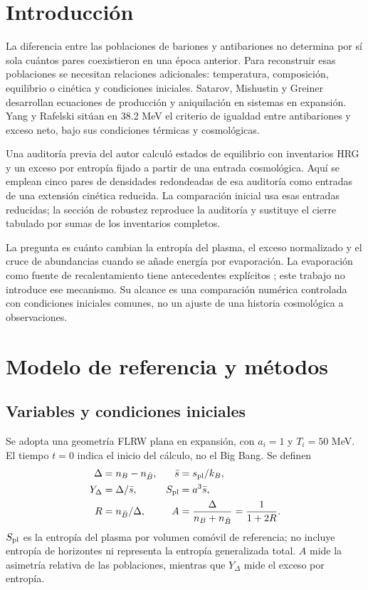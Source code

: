 \documentclass[10pt,twocolumn,a4paper]{article}
\newcommand{\nb}{{n_{\bar B}}}
\newcommand{\Y}{{Y_\Delta}}
\newcommand{\sbar}{\bar s}
\begin{document}
\section{Introducción}
La diferencia entre las poblaciones de bariones y antibariones no determina por sí sola cuántos pares coexistieron en una época anterior. Para reconstruir esas poblaciones se necesitan relaciones adicionales: temperatura, composición, equilibrio o cinética y condiciones iniciales. Satarov, Mishustin y Greiner \cite{satarov} desarrollan ecuaciones de producción y aniquilación en sistemas en expansión. Yang y Rafelski \cite{yang} sitúan en 38.2 MeV el criterio de igualdad entre antibariones y exceso neto, bajo sus condiciones térmicas y cosmológicas.

Una auditoría previa del autor \cite{garcia} calculó estados de equilibrio con inventarios HRG y un exceso por entropía fijado a partir de una entrada cosmológica. Aquí se emplean cinco pares de densidades redondeadas de esa auditoría como entradas de una extensión cinética reducida. La comparación inicial usa esas entradas reducidas; la sección de robustez reproduce la auditoría y sustituye el cierre tabulado por sumas de los inventarios completos.

La pregunta es cuánto cambian la entropía del plasma, el exceso normalizado y el cruce de abundancias cuando se añade energía por evaporación. La evaporación como fuente de recalentamiento tiene antecedentes explícitos \cite{haque}; este trabajo no introduce ese mecanismo. Su alcance es una comparación numérica controlada con condiciones iniciales comunes, no un ajuste de una historia cosmológica a observaciones.

\section{Modelo de referencia y métodos}
\subsection{Variables y condiciones iniciales}
Se adopta una geometría FLRW plana en expansión, con $a_i=1$ y $T_i=50$ MeV. El tiempo $t=0$ indica el inicio del cálculo, no el Big Bang. Se definen
\begin{align}
\Delta&=n_B-\nb, & \sbar&=s_{\rm pl}/k_B,\\
\Y&=\Delta/\sbar, & S_{\rm pl}&=a^3\sbar,\\
R&=\nb/\Delta, & A&=\frac{\Delta}{n_B+\nb}=\frac{1}{1+2R}.
\end{align}
$S_{\rm pl}$ es la entropía del plasma por volumen comóvil de referencia; no incluye entropía de horizontes ni representa la entropía generalizada total. $A$ mide la asimetría relativa de las poblaciones, mientras que $\Y$ mide el exceso por entropía.
\end{document}
